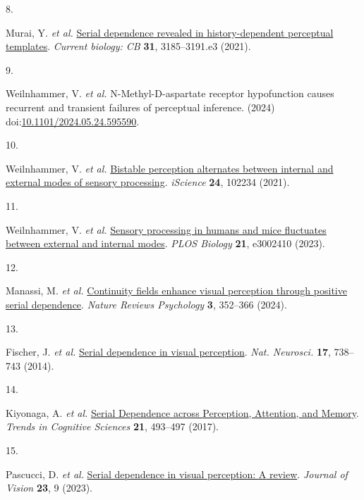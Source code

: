 \documentclass[
]{article}
\newlength{\cslhangindent}
\newlength{\csllabelwidth}
\newlength{\cslentryspacingunit} %
\newenvironment{CSLReferences}[2] %
 {%
  \setlength{\parindent}{0pt}
  \ifodd #1
  \let\oldpar\par
  \def\par{\hangindent=\cslhangindent\oldpar}
  \fi
  \setlength{\parskip}{#2\cslentryspacingunit}
 }%
 {}
\newcommand{\CSLLeftMargin}[1]{\parbox[t]{\csllabelwidth}{#1}}
\newcommand{\CSLRightInline}[1]{\parbox[t]{\linewidth - \csllabelwidth}{#1}\break}
\begin{document}
\begin{CSLReferences}{0}{0}
\leavevmode{}%
\CSLLeftMargin{8. }%
\CSLRightInline{Murai, Y. \emph{et al.}
\href{https://doi.org/10.1016/j.cub.2021.05.006}{Serial dependence
revealed in history-dependent perceptual templates}. \emph{Current
biology: CB} \textbf{31}, 3185--3191.e3 (2021).}

\leavevmode{}%
\CSLLeftMargin{9. }%
\CSLRightInline{Weilnhammer, V. \emph{et al.} N-{Methyl}-{D}-aspartate
receptor hypofunction causes recurrent and transient failures of
perceptual inference. (2024)
doi:\href{https://doi.org/10.1101/2024.05.24.595590}{10.1101/2024.05.24.595590}.}

\leavevmode{}%
\CSLLeftMargin{10. }%
\CSLRightInline{Weilnhammer, V. \emph{et al.}
\href{https://doi.org/10.1016/j.isci.2021.102234}{Bistable perception
alternates between internal and external modes of sensory processing}.
\emph{iScience} \textbf{24}, 102234 (2021).}

\leavevmode{}%
\CSLLeftMargin{11. }%
\CSLRightInline{Weilnhammer, V. \emph{et al.}
\href{https://doi.org/10.1371/journal.pbio.3002410}{Sensory processing
in humans and mice fluctuates between external and internal modes}.
\emph{PLOS Biology} \textbf{21}, e3002410 (2023).}

\leavevmode{}%
\CSLLeftMargin{12. }%
\CSLRightInline{Manassi, M. \emph{et al.}
\href{https://doi.org/10.1038/s44159-024-00297-x}{Continuity fields
enhance visual perception through positive serial dependence}.
\emph{Nature Reviews Psychology} \textbf{3}, 352--366 (2024).}

\leavevmode{}%
\CSLLeftMargin{13. }%
\CSLRightInline{Fischer, J. \emph{et al.}
\href{https://doi.org/10.1038/nn.3689}{Serial dependence in visual
perception}. \emph{Nat. Neurosci.} \textbf{17}, 738--743 (2014).}

\leavevmode{}%
\CSLLeftMargin{14. }%
\CSLRightInline{Kiyonaga, A. \emph{et al.}
\href{https://doi.org/10.1016/j.tics.2017.04.011}{Serial {Dependence}
across {Perception}, {Attention}, and {Memory}}. \emph{Trends in
Cognitive Sciences} \textbf{21}, 493--497 (2017).}

\leavevmode{}%
\CSLLeftMargin{15. }%
\CSLRightInline{Pascucci, D. \emph{et al.}
\href{https://doi.org/10.1167/jov.23.1.9}{Serial dependence in visual
perception: {A} review}. \emph{Journal of Vision} \textbf{23}, 9
(2023).}


\end{CSLReferences}
\end{document}
